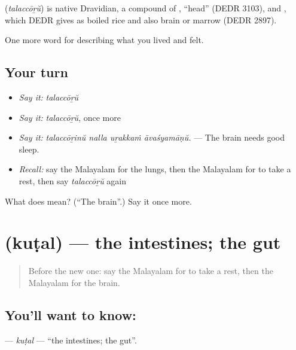 \begin{cousinweb}
\textbf{} (\emph{talaccōṟŭ}) is native Dravidian, a compound of , \textquotedblleft{}head\textquotedblright{} (DEDR 3103), and , which DEDR gives as boiled rice and also brain or marrow (DEDR 2897).
\end{cousinweb}

\begin{grammarlens}[title={What you've built}]
One more word for describing what you lived and felt.
\end{grammarlens}

\subsection*{Your turn}
\begin{itemize}
\raggedright
  \item \emph{Say it:} \emph{talaccōṟŭ}
  \item \emph{Say it:} \emph{talaccōṟŭ}, once more
  \item \emph{Say it:} \emph{talaccōṟinŭ nalla uṟakkaṁ āvaśyamāṇŭ.} — The brain needs good sleep.
  \item \emph{Recall:} say the Malayalam for the lungs, then the Malayalam for to take a rest, then say \emph{talaccōṟŭ} again
\end{itemize}

\begin{tcolorbox}[breakable,colback=teal!4,colframe=teal!35!black,title={Before you move on}]
What does  mean? (\textquotedblleft{}The brain\textquotedblright{}.) Say it once more.
\end{tcolorbox}
\section[\texorpdfstring{\ml{കുടൽ} (kuṭal)}{കുടൽ (kuṭal)}]{ (kuṭal) — the intestines; the gut}

\label{lesson:ML-C537-kutal}



\begin{quote}
Before the new one: say the Malayalam for to take a rest, then the Malayalam for the brain.
\end{quote}

\subsection*{You'll want to know: }
\textbf{} — \emph{kuṭal} — \textquotedblleft{}the intestines; the gut\textquotedblright{}.

